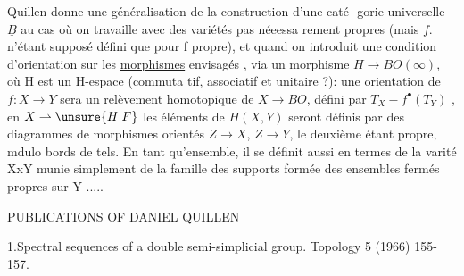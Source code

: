 Quillen donne une généralisation de la construction d'une caté-%
gorie universelle $\underline{B}$ au cas où on travaille avec des variétés pas néeessa%
rement propres (mais $f.$ n'étant supposé défini que pour f propre), et
quand on introduit une condition d'orientation  sur les \uline{morphismes}
envisagés , via un morphisme $H\to BO(\infty)$, où H est un H-espace (commuta%
tif, associatif et unitaire ?): une orientation de $f:X\to Y$ sera un
relèvement homotopique de $X\to BO$, défini par  $T_X-f^{\bullet}(T_Y)$ , en $X\rightharpoonup\unsure{H|F}$
les éléments de $H(X,Y)$ seront définis par des diagrammes de morphismes
orientés $Z\to X$, $Z\to Y$, le deuxième étant propre, mdulo bords de tels.
En tant qu'ensemble, il se définit aussi en termes de la varité XxY
munie simplement de la famille des supports formée des ensembles fermés
propres sur Y ..... 



\begin{center}
PUBLICATIONS OF DANIEL QUILLEN
\end{center}

1.\quad Spectral sequences of a double semi-simplicial
group. Topology 5 (1966) 155-157.

